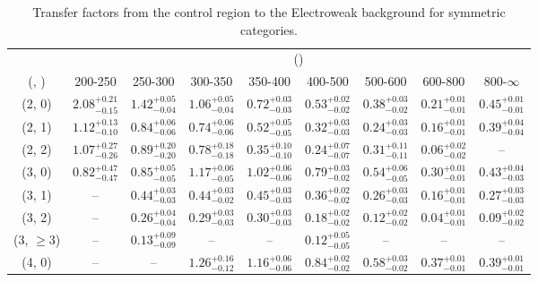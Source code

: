 \begin{table}[h!]
\tiny
\centering
\caption{Transfer factors from the \mj control region to the Electroweak background for symmetric categories.\label{tab:tf_mu_total_sym}}
\begin{tabular}
{ccccccccc}
	\hline\hline
	& \multicolumn{8}{c}{\scalht (\gev)} \\ 
	 (\njet,  \nb) & 200-250 & 250-300 & 300-350 & 350-400 & 400-500 & 500-600 & 600-800 & 800-$\infty$ \\ [0.8ex] 
\hline
	(2, 0) & $2.08^{+ 0.21 }_{- 0.15 }$ & $1.42^{+ 0.05 }_{- 0.04 }$ & $1.06^{+ 0.05 }_{- 0.04 }$ & $0.72^{+ 0.03 }_{- 0.03 }$ & $0.53^{+ 0.02 }_{- 0.02 }$ & $0.38^{+ 0.03 }_{- 0.02 }$ & $0.21^{+ 0.01 }_{- 0.01 }$ & $0.45^{+ 0.01 }_{- 0.01 }$ \\[0.5ex] 
	(2, 1) & $1.12^{+ 0.13 }_{- 0.10 }$ & $0.84^{+ 0.06 }_{- 0.06 }$ & $0.74^{+ 0.06 }_{- 0.06 }$ & $0.52^{+ 0.05 }_{- 0.05 }$ & $0.32^{+ 0.03 }_{- 0.03 }$ & $0.24^{+ 0.03 }_{- 0.03 }$ & $0.16^{+ 0.01 }_{- 0.01 }$ & $0.39^{+ 0.04 }_{- 0.04 }$ \\[0.5ex] 
	(2, 2) & $1.07^{+ 0.27 }_{- 0.26 }$ & $0.89^{+ 0.20 }_{- 0.20 }$ & $0.78^{+ 0.18 }_{- 0.18 }$ & $0.35^{+ 0.10 }_{- 0.10 }$ & $0.24^{+ 0.07 }_{- 0.07 }$ & $0.31^{+ 0.11 }_{- 0.11 }$ & $0.06^{+ 0.02 }_{- 0.02 }$ & -- \\[0.5ex] 
	(3, 0) & $0.82^{+ 0.47 }_{- 0.47 }$ & $0.85^{+ 0.05 }_{- 0.05 }$ & $1.17^{+ 0.06 }_{- 0.05 }$ & $1.02^{+ 0.06 }_{- 0.06 }$ & $0.79^{+ 0.03 }_{- 0.02 }$ & $0.54^{+ 0.06 }_{- 0.05 }$ & $0.30^{+ 0.01 }_{- 0.01 }$ & $0.43^{+ 0.04 }_{- 0.03 }$ \\[0.5ex] 
	(3, 1) & -- & $0.44^{+ 0.03 }_{- 0.03 }$ & $0.44^{+ 0.03 }_{- 0.02 }$ & $0.45^{+ 0.03 }_{- 0.03 }$ & $0.36^{+ 0.02 }_{- 0.02 }$ & $0.26^{+ 0.03 }_{- 0.03 }$ & $0.16^{+ 0.01 }_{- 0.01 }$ & $0.27^{+ 0.03 }_{- 0.03 }$ \\[0.5ex] 
	(3, 2) & -- & $0.26^{+ 0.04 }_{- 0.04 }$ & $0.29^{+ 0.03 }_{- 0.03 }$ & $0.30^{+ 0.03 }_{- 0.03 }$ & $0.18^{+ 0.02 }_{- 0.02 }$ & $0.12^{+ 0.02 }_{- 0.02 }$ & $0.04^{+ 0.01 }_{- 0.01 }$ & $0.09^{+ 0.02 }_{- 0.02 }$ \\[0.5ex] 
	(3, $\ge3$) & -- & $0.13^{+ 0.09 }_{- 0.09 }$ & -- & -- & $0.12^{+ 0.05 }_{- 0.05 }$ & -- & -- & -- \\[0.5ex] 
	(4, 0) & -- & -- & $1.26^{+ 0.16 }_{- 0.12 }$ & $1.16^{+ 0.06 }_{- 0.06 }$ & $0.84^{+ 0.02 }_{- 0.02 }$ & $0.58^{+ 0.03 }_{- 0.02 }$ & $0.37^{+ 0.01 }_{- 0.01 }$ & $0.39^{+ 0.01 }_{- 0.01 }$ \\[0.5ex] 

\end{tabular}
\end{table}
